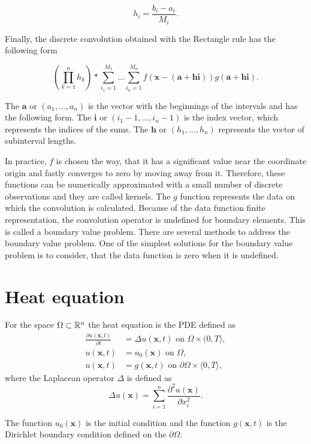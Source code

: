 \begin{equation}
  h_i = \frac{b_i - a_i}{M_i}.
\end{equation}

Finally, the discrete convolution obtained with the Rectangle rule has the following form

\begin{equation}
  (\prod_{k=1}^{n} h_k) * \sum_{i_1 = 1}^{M_1} \dots \sum_{i_n = 1}^{M_n} f(\mathbf{x} - (\mathbf{a} + \mathbf{h} \mathbf{i})) g(\mathbf{a} + \mathbf{h} \mathbf{i}).
\end{equation}

The \(\mathbf{a}\) or \((a_1, \dots, a_n)\) is the vector with the beginnings of the intervals and has the following form.
The \(\mathbf{i}\) or \((i_1 - 1, \dots, i_n - 1)\) is the index vector, which represents the indices of the sums.
The \(\mathbf{h}\) or \((h_1, \dots, h_n)\) represents the vector of subinterval lengths.

In practice, \(f\) is chosen the way, that it has a significant value near the coordinate origin and fastly converges to zero by moving away from it.
Therefore, these functions can be numerically approximated with a small number of discrete observations and they are called kernels.
The \(g\) function represents the data on which the convolution is calculated.
Because of the data function finite representation, the convolution operator is undefined for boundary elements.
This is called a boundary value problem.
There are several methods to address the boundary value problem.
One of the simplest solutions for the boundary value problem is to consider, that the data function is zero when it is undefined.

\section{Heat equation} \label{sec:heat-equation}

\begin{definition}
For the space \(\Omega \subset \Bbb{R}^n \) the heat equation is the PDE defined as
\begin{equation}
 \begin{aligned}
 \frac{\partial u(\boldsymbol x, t)}{\partial t} &= \Delta u(\boldsymbol x, t) \text{ on } \Omega \times (0, T\rangle, \\
 u(\boldsymbol x, t) &= u_0(\boldsymbol x) \text{ on } \Omega, \\
 u(\boldsymbol x, t) &= g(\boldsymbol x, t) \text{ on } \partial \Omega \times \langle 0, T \rangle,
 \end{aligned}
\end{equation}
where the Laplacean operator \( \Delta\) is defined as
\begin{equation}
 \Delta u(\boldsymbol x) = \sum_{i = 1}^{n} \frac{\partial^2 u(\boldsymbol x)}{\partial x_i^{2}}.
\end{equation}

The function \(u_0(\boldsymbol x)\) is the initial condition and the function \(g(\boldsymbol x, t)\) is the Dirichlet boundary condition defined on the \(\partial \Omega\).
\end{definition}

